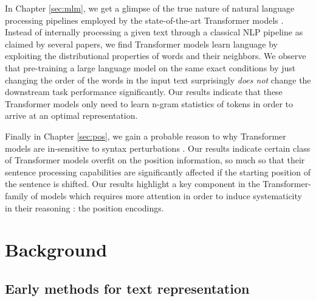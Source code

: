 \documentclass[letterpaper, 12pt]{report}
\begin{document}
In Chapter \autoref{sec:mlm}, we get a glimpse of the true nature of natural language processing pipelines employed by the state-of-the-art Transformer models \citep{sinha-etal-2021-masked}. Instead of internally processing a given text through a classical NLP pipeline as claimed by several papers, we find Transformer models learn language by exploiting the distributional properties of words and their neighbors. We observe that pre-training a large language model on the same exact conditions by just changing the order of the words in the input text surprisingly \textit{does not} change the downstream task performance significantly. Our results indicate that these Transformer models only need to learn n-gram statistics of tokens in order to arrive at an optimal representation.

Finally in Chapter \autoref{sec:pos}, we gain a probable reason to why Transformer models are in-sensitive to syntax perturbations \citep{sinha2022pos}. Our results indicate certain class of Transformer models overfit on the position information, so much so that their sentence processing capabilities are significantly affected if the starting position of the sentence is shifted. Our results highlight a key component in the Transformer-family of models which requires more attention in order to induce systematicity in their reasoning : the position encodings.

\clearpage

\chapter{Background}
\label{chap:background}


\section{Early methods for text representation}
\label{sec:bg_early_methods}
\end{document}

